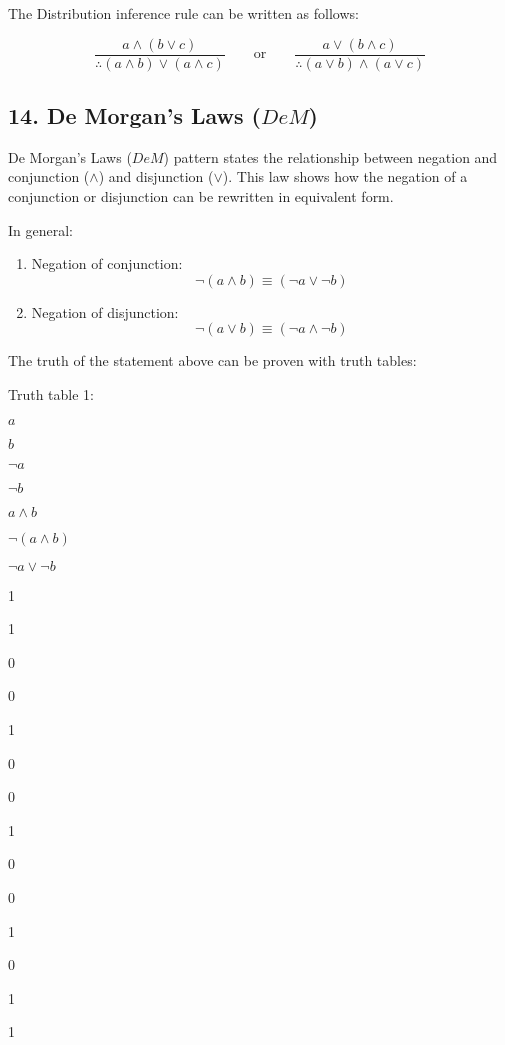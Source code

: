 The Distribution inference rule can be written as follows:

\[
\frac{a \land (b \lor c)}{\therefore (a \land b) \lor (a \land c)}
\qquad \text{or} \qquad
\frac{a \lor (b \land c)}{\therefore (a \lor b) \land (a \lor c)}
\]

\subsection{\texorpdfstring{14. De Morgan's Laws
(\(DeM\))}{14. De Morgan's Laws (DeM)}}\label{de-morgans-laws-dem}

De Morgan's Laws (\(DeM\)) pattern states the relationship between
negation and conjunction (\(\land\)) and disjunction (\(\lor\)). This
law shows how the negation of a conjunction or disjunction can be
rewritten in equivalent form.

In general:

\begin{enumerate}
\def\labelenumi{\arabic{enumi}.}
\item
  Negation of conjunction:\\
  \[\lnot (a \land b) \equiv (\lnot a \lor \lnot b)\]
\item
  Negation of disjunction:\\
  \[\lnot (a \lor b) \equiv (\lnot a \land \lnot b)\]
\end{enumerate}

The truth of the statement above can be proven with truth tables:

Truth table 1:

\(a\)

\(b\)

\(\neg a\)

\(\neg b\)

\(a \land b\)

\(\neg (a \land b)\)

\(\neg a \lor \neg b\)

1

1

0

0

1

0

0

1

0

0

1

0

1

1

